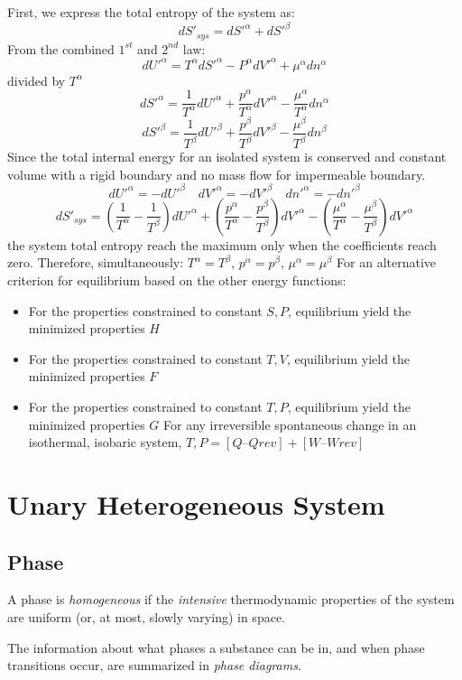 \documentclass[UTF8]{book}
\begin{document}
 {First, we express the total entropy of the system as:}
$$dS'_{sys}=dS'^\alpha +dS'^\beta $$
 {From the combined $1^{st}$ and $2^{nd}$ law:}
$$dU'^\alpha =T^\alpha dS'^\alpha -P^\alpha dV'^\alpha +\mu ^\alpha dn^\alpha $$
 {divided by $T^\alpha $}
$$dS'^\alpha =\dfrac{1}{T^\alpha }dU'^\alpha +\dfrac{p^\alpha }{T^\alpha }dV'^\alpha -\dfrac{\mu ^\alpha }{T^\alpha }dn^\alpha $$
$$dS'^\beta  =\dfrac{1}{T^\beta }dU'^\beta +\dfrac{p^\beta }{T^\beta }dV'^\beta -\dfrac{\mu ^\beta }{T^\beta }dn^\beta $$
 {Since the total internal energy for an isolated system is conserved and constant volume with a rigid boundary and no mass flow for impermeable boundary.}
$$dU'^\alpha=-dU'^\beta \quad dV'^\alpha=-dV'^\beta \quad dn'^\alpha=-dn'^\beta $$
$$dS'_{sys}=\left(\dfrac{1}{T^\alpha }-\dfrac{1}{T^\beta }\right)dU'^\alpha+\left(\dfrac{p^\alpha }{T^\alpha }-\dfrac{p^\beta }{T^\beta }\right)dV'^\alpha-\left(\dfrac{\mu ^\alpha }{T^\alpha }-\dfrac{\mu ^\beta }{T^\beta }\right)dV'^\alpha $$
 {the system total entropy reach the maximum only when the coefficients reach zero. Therefore, simultaneously: $T^\alpha =T^\beta $, $p^\alpha =p^\beta $, $\mu ^\alpha =\mu ^\beta $}
 {For an alternative criterion for equilibrium based on the other energy functions: }
\begin{itemize}
\item  {For the properties constrained to constant $S,P$, equilibrium yield the minimized properties $H$}
\item  {For the properties constrained to constant $T,V$, equilibrium yield the minimized properties $F$}
\item  {For the properties constrained to constant $T,P$, equilibrium yield the minimized properties $G$}
For any irreversible spontaneous change in an
isothermal, isobaric system, $ T,P = [Q – Q rev ] + [W – W rev ]$
\end{itemize}

\section{Unary Heterogeneous System}
\subsection{Phase}
A phase is \emph{homogeneous} if the
\emph{intensive} thermodynamic properties
of the system are uniform (or, at
most, slowly varying) in space.

The information about what phases a substance can be
in, and when phase transitions occur, are summarized in
\emph{phase diagrams}.
\end{document}
